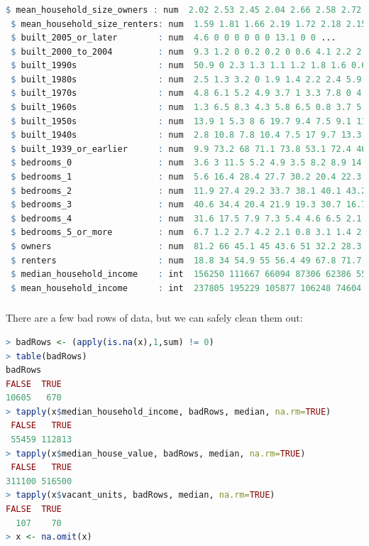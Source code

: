 \documentclass[xetex,mathserif,serif,aspectratio=169]{beamer}
\begin{document}
\begin{frame}[fragile] \frametitle{} \oldB \small

\begin{lstlisting}[language=R, basicstyle=\fontsize{8pt}{10pt}\selectfont\ttfamily]
 $ mean_household_size_owners : num  2.02 2.53 2.45 2.04 2.66 2.58 2.72 2.17 2.7 2.75 ...
 $ mean_household_size_renters: num  1.59 1.81 1.66 2.19 1.72 2.18 2.15 1.93 1.92 2.08 ...
 $ built_2005_or_later        : num  4.6 0 0 0 0 0 0 13.1 0 0 ...
 $ built_2000_to_2004         : num  9.3 1.2 0 0.2 0.2 0 0.6 4.1 2.2 2.2 ...
 $ built_1990s                : num  50.9 0 2.3 1.3 1.1 1.2 1.8 1.6 0.6 0 ...
 $ built_1980s                : num  2.5 1.3 3.2 0 1.9 1.4 2.2 2.4 5.9 0.5 ...
 $ built_1970s                : num  4.8 6.1 5.2 4.9 3.7 1 3.3 7.8 0 4.3 ...
 $ built_1960s                : num  1.3 6.5 8.3 4.3 5.8 6.5 0.8 3.7 5.5 11.2 ...
 $ built_1950s                : num  13.9 1 5.3 8 6 19.7 9.4 7.5 9.1 11.3 ...
 $ built_1940s                : num  2.8 10.8 7.8 10.4 7.5 17 9.7 13.3 14.7 8.5 ...
 $ built_1939_or_earlier      : num  9.9 73.2 68 71.1 73.8 53.1 72.4 46.5 62 62.1 ...
 $ bedrooms_0                 : num  3.6 3 11.5 5.2 4.9 3.5 8.2 8.9 14.2 6.1 ...
 $ bedrooms_1                 : num  5.6 16.4 28.4 27.7 30.2 20.4 22.3 25 20.1 29.3 ...
 $ bedrooms_2                 : num  11.9 27.4 29.2 33.7 38.1 40.1 43.2 37.5 39.4 35.4 ...
 $ bedrooms_3                 : num  40.6 34.4 20.4 21.9 19.3 30.7 16.7 25 18.3 25.3 ...
 $ bedrooms_4                 : num  31.6 17.5 7.9 7.3 5.4 4.6 6.5 2.1 5.5 3.9 ...
 $ bedrooms_5_or_more         : num  6.7 1.2 2.7 4.2 2.1 0.8 3.1 1.4 2.5 0 ...
 $ owners                     : num  81.2 66 45.1 45 43.6 51 32.2 28.3 31.7 35.1 ...
 $ renters                    : num  18.8 34 54.9 55 56.4 49 67.8 71.7 68.3 64.9 ...
 $ median_household_income    : int  156250 111667 66094 87306 62386 55658 40402 ...
 $ mean_household_income      : int  237805 195229 105877 106248 74604 73933 ...
\end{lstlisting}

\end{frame}

\begin{frame}[fragile] \frametitle{} \oldB \small

There are a few bad rows of data, but we can safely clean them
out:
\begin{lstlisting}[language=R, basicstyle=\fontsize{8pt}{10pt}\selectfont\ttfamily]
> badRows <- (apply(is.na(x),1,sum) != 0)
> table(badRows)
badRows
FALSE  TRUE
10605   670
> tapply(x$median_household_income, badRows, median, na.rm=TRUE)
 FALSE   TRUE
 55459 112813
> tapply(x$median_house_value, badRows, median, na.rm=TRUE)
 FALSE   TRUE
311100 516500
> tapply(x$vacant_units, badRows, median, na.rm=TRUE)
FALSE  TRUE
  107    70
> x <- na.omit(x)
\end{lstlisting}

\end{frame}
\end{document}
